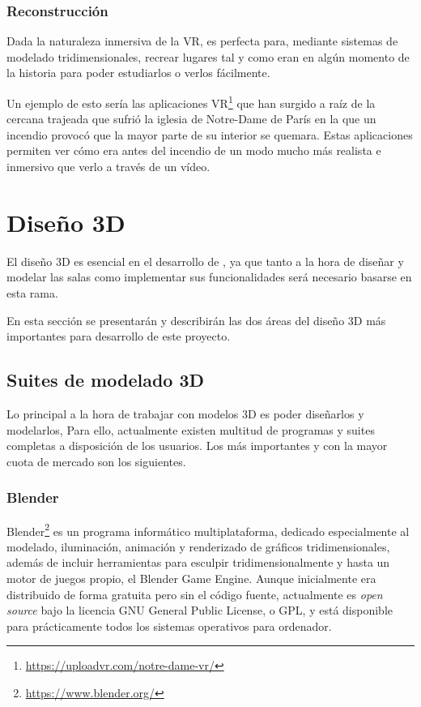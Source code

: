 \subsubsection{Reconstrucción}

Dada la naturaleza inmersiva de la \acs{VR}, es perfecta para, mediante sistemas de modelado tridimensionales, recrear lugares tal y como eran en algún momento de la historia para poder estudiarlos o verlos fácilmente.

Un ejemplo de esto sería las aplicaciones \acs{VR}\footnote{\url{https://uploadvr.com/notre-dame-vr/}} que han surgido a raíz de la cercana trajeada que sufrió la iglesia de Notre-Dame de París en la que un incendio provocó que la mayor parte de su interior se quemara. Estas aplicaciones permiten ver cómo era antes del incendio de un modo mucho más realista e inmersivo que verlo a través de un vídeo.

\section{Diseño 3D}

El diseño 3D es esencial en el desarrollo de \MineRVa, ya que tanto a la hora de diseñar y modelar las salas como implementar sus funcionalidades será necesario basarse en esta rama.

En esta sección se presentarán y describirán las dos áreas del diseño 3D más importantes para desarrollo de este proyecto.

\subsection{Suites de modelado 3D}

Lo principal a la hora de trabajar con modelos 3D es poder diseñarlos y modelarlos, Para ello, actualmente existen multitud de programas y suites completas a disposición de los usuarios. Los más importantes y con la mayor cuota de mercado son los siguientes. 

\subsubsection{Blender}

Blender\footnote{\url{https://www.blender.org/}} es un programa informático multiplataforma, dedicado especialmente al modelado, iluminación, animación y renderizado de gráficos tridimensionales, además de incluir herramientas para esculpir tridimensionalmente y hasta un motor de juegos propio, el Blender Game Engine. Aunque inicialmente era distribuido de forma gratuita pero sin el código fuente, actualmente es \textit{open source} bajo la licencia GNU General Public License, o GPL, y está disponible para prácticamente todos los sistemas operativos para ordenador.

